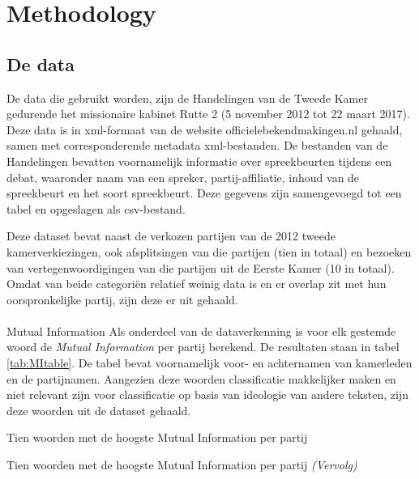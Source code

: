 \section{Methodology}
\label{sec:meth}


\subsection{De data}
De data die gebruikt worden, zijn de Handelingen van de Tweede Kamer gedurende het missionaire kabinet Rutte 2 (5 november 2012 tot 22 maart 2017). Deze data is in xml-formaat van de website officielebekendmakingen.nl gehaald, samen met corresponderende metadata xml-bestanden. De bestanden van de Handelingen bevatten voornamelijk informatie over spreekbeurten tijdens een debat, waaronder naam van een spreker, partij-affiliatie, inhoud van de spreekbeurt en het soort spreekbeurt. Deze gegevens zijn samengevoegd tot een tabel en opgeslagen als csv-bestand.\par
Deze dataset bevat naast de verkozen partijen van de 2012 tweede kamerverkiezingen, ook afsplitsingen van die partijen (tien in totaal) en bezoeken van vertegenwoordigingen van die partijen uit de Eerste Kamer (10 in totaal). Omdat van beide categori\"{e}n relatief weinig data is en er overlap zit met hun oorspronkelijke partij, zijn deze er uit gehaald.
\begin{table}[H]
\centering

\end{table}

\paragraph{}{Mutual Information}
Als onderdeel van de dataverkenning is voor elk gestemde woord de \textit{Mutual Information} per partij berekend. De resultaten staan in tabel \ref{tab:MItable}. De tabel bevat voornamelijk voor- en achternamen van kamerleden en de partijnamen. Aangezien deze woorden classificatie makkelijker maken en niet relevant zijn voor classificatie op basis van ideologie van andere teksten, zijn deze woorden uit de dataset gehaald.
\begin{table}[H]
\caption{Tien woorden met de hoogste Mutual Information per partij}
\label{tab:MItable}
\centering

\end{table}
\addtocounter{table}{-1}
\begin{table}[H]
\caption{Tien woorden met de hoogste Mutual Information per partij \emph{(Vervolg)}}
\centering

\end{table}


